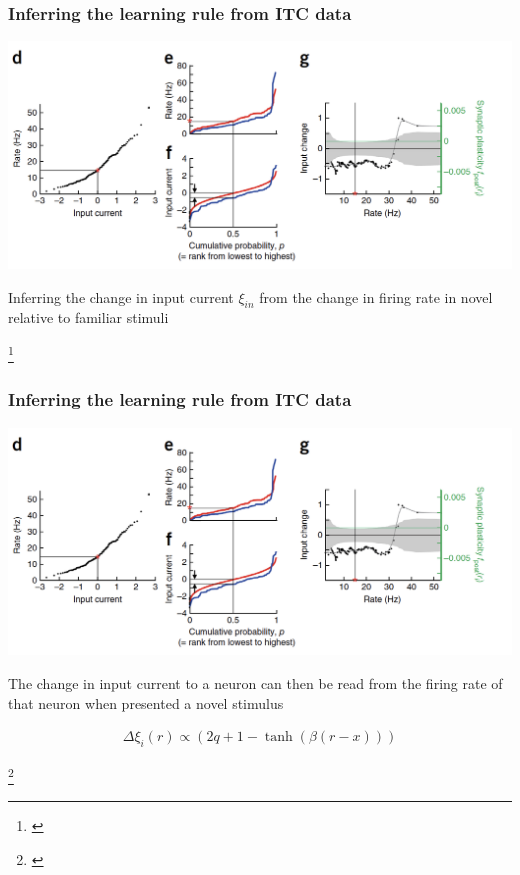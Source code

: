 \documentclass{beamer}
\begin{document}
\begin{frame}[plain]
\frametitle{Inferring the learning rule from ITC data}

\begin{center}
\includegraphics[scale=0.55]{learning}
\end{center}

Inferring the change in input current $\xi_{in}$ from the change in firing rate in {\color{red} novel} relative to {\color{blue} familiar} stimuli

\footnote{\cite{lim}}

\end{frame}

\begin{frame}[plain]
\frametitle{Inferring the learning rule from ITC data}

\begin{center}
\includegraphics[scale=0.52]{learning}
\end{center}

The change in input current to a neuron can then be read from the firing rate of that neuron when presented a novel stimulus

\begin{align*}
\Delta \xi_{i}(r) \propto (2q + 1 - \tanh (\beta (r-x)))
\end{align*}

\footnote{\cite{lim}}

\end{frame}
\end{document}
